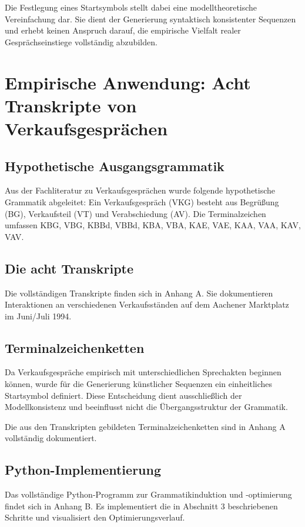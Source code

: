 \documentclass[
  12pt,
  a4paper,
  oneside,
  titlepage
]{article}
\begin{document}
Die Festlegung eines Startsymbols stellt dabei eine modelltheoretische 
Vereinfachung dar. Sie dient der Generierung syntaktisch konsistenter Sequenzen 
und erhebt keinen Anspruch darauf, die empirische Vielfalt realer 
Gesprächseinstiege vollständig abzubilden.

\section{Empirische Anwendung: Acht Transkripte von Verkaufsgesprächen}

\subsection{Hypothetische Ausgangsgrammatik}

Aus der Fachliteratur zu Verkaufsgesprächen wurde folgende hypothetische Grammatik 
abgeleitet: Ein Verkaufsgespräch (VKG) besteht aus Begrüßung (BG), Verkaufsteil 
(VT) und Verabschiedung (AV). Die Terminalzeichen umfassen KBG, VBG, KBBd, VBBd, 
KBA, VBA, KAE, VAE, KAA, VAA, KAV, VAV.

\subsection{Die acht Transkripte}

Die vollständigen Transkripte finden sich in Anhang A. Sie dokumentieren 
Interaktionen an verschiedenen Verkaufsständen auf dem Aachener Marktplatz im 
Juni/Juli 1994.

\subsection{Terminalzeichenketten}

Da Verkaufsgespräche empirisch mit unterschiedlichen Sprechakten beginnen können, 
wurde für die Generierung künstlicher Sequenzen ein einheitliches Startsymbol 
definiert. Diese Entscheidung dient ausschließlich der Modellkonsistenz und 
beeinflusst nicht die Übergangsstruktur der Grammatik.

Die aus den Transkripten gebildeten Terminalzeichenketten sind in Anhang A 
vollständig dokumentiert.

\subsection{Python-Implementierung}

Das vollständige Python-Programm zur Grammatikinduktion und -optimierung findet 
sich in Anhang B. Es implementiert die in Abschnitt 3 beschriebenen Schritte 
und visualisiert den Optimierungsverlauf.
\end{document}
